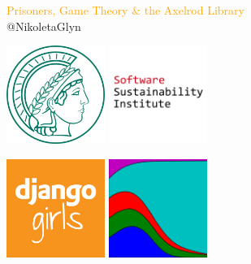 \documentclass{beamer}
\begin{document}
\begin{frame}
    \begin{center}
        \large{\textcolor{orange}{Prisoners, Game Theory \& the Axelrod Library}} \\

        \vspace{1cm}
        \normalsize{@NikoletaGlyn}

    \end{center}
\end{frame}

\begin{frame}
    \begin{center}
    \includegraphics[width=0.24\textwidth]{static/mpi.jpg}\hspace{6pt}
    \includegraphics[width=0.24\textwidth]{static/ssi-logo.png}\hspace{6pt}

    \hspace{-6pt}\includegraphics[width=0.24\textwidth]{static/django_girls.png}\hspace{6pt}
    \includegraphics[width=0.24\textwidth, height=0.245\textwidth]{static/axelrod-logo.png}\hspace{6pt}
    \end{center}
\end{frame}
\end{document}
